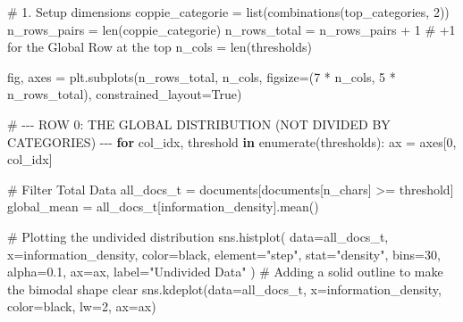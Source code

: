 \documentclass[
  italian,
  a4paper,
]{article}
\newenvironment{Shaded}{\begin{snugshade}}{\end{snugshade}}
\newcommand{\BuiltInTok}[1]{\textcolor[rgb]{0.00,0.23,0.31}{#1}}
\newcommand{\CommentTok}[1]{\textcolor[rgb]{0.37,0.37,0.37}{#1}}
\newcommand{\ControlFlowTok}[1]{\textcolor[rgb]{0.00,0.23,0.31}{\textbf{#1}}}
\newcommand{\DecValTok}[1]{\textcolor[rgb]{0.68,0.00,0.00}{#1}}
\newcommand{\FloatTok}[1]{\textcolor[rgb]{0.68,0.00,0.00}{#1}}
\newcommand{\KeywordTok}[1]{\textcolor[rgb]{0.00,0.23,0.31}{\textbf{#1}}}
\newcommand{\NormalTok}[1]{\textcolor[rgb]{0.00,0.23,0.31}{#1}}
\newcommand{\OperatorTok}[1]{\textcolor[rgb]{0.37,0.37,0.37}{#1}}
\newcommand{\StringTok}[1]{\textcolor[rgb]{0.13,0.47,0.30}{#1}}
\newcommand{\VariableTok}[1]{\textcolor[rgb]{0.07,0.07,0.07}{#1}}
\begin{document}
\begin{Shaded}
\begin{Highlighting}[]
\CommentTok{\# 1. Setup dimensions}
\NormalTok{coppie\_categorie }\OperatorTok{=} \BuiltInTok{list}\NormalTok{(combinations(top\_categories, }\DecValTok{2}\NormalTok{))}
\NormalTok{n\_rows\_pairs }\OperatorTok{=} \BuiltInTok{len}\NormalTok{(coppie\_categorie)}
\NormalTok{n\_rows\_total }\OperatorTok{=}\NormalTok{ n\_rows\_pairs }\OperatorTok{+} \DecValTok{1} \CommentTok{\# +1 for the Global Row at the top}
\NormalTok{n\_cols }\OperatorTok{=} \BuiltInTok{len}\NormalTok{(thresholds)}

\NormalTok{fig, axes }\OperatorTok{=}\NormalTok{ plt.subplots(n\_rows\_total, n\_cols, figsize}\OperatorTok{=}\NormalTok{(}\DecValTok{7} \OperatorTok{*}\NormalTok{ n\_cols, }\DecValTok{5} \OperatorTok{*}\NormalTok{ n\_rows\_total), constrained\_layout}\OperatorTok{=}\VariableTok{True}\NormalTok{)}

\CommentTok{\# {-}{-}{-} ROW 0: THE GLOBAL DISTRIBUTION (NOT DIVIDED BY CATEGORIES) {-}{-}{-}}
\ControlFlowTok{for}\NormalTok{ col\_idx, threshold }\KeywordTok{in} \BuiltInTok{enumerate}\NormalTok{(thresholds):}
\NormalTok{    ax }\OperatorTok{=}\NormalTok{ axes[}\DecValTok{0}\NormalTok{, col\_idx]}
    
    \CommentTok{\# Filter Total Data}
\NormalTok{    all\_docs\_t }\OperatorTok{=}\NormalTok{ documents[documents[}\StringTok{\textquotesingle{}n\_chars\textquotesingle{}}\NormalTok{] }\OperatorTok{\textgreater{}=}\NormalTok{ threshold]}
\NormalTok{    global\_mean }\OperatorTok{=}\NormalTok{ all\_docs\_t[}\StringTok{\textquotesingle{}information\_density\textquotesingle{}}\NormalTok{].mean()}
    
    \CommentTok{\# Plotting the undivided distribution}
\NormalTok{    sns.histplot(}
\NormalTok{        data}\OperatorTok{=}\NormalTok{all\_docs\_t, x}\OperatorTok{=}\StringTok{\textquotesingle{}information\_density\textquotesingle{}}\NormalTok{, }
\NormalTok{        color}\OperatorTok{=}\StringTok{\textquotesingle{}black\textquotesingle{}}\NormalTok{, element}\OperatorTok{=}\StringTok{"step"}\NormalTok{, stat}\OperatorTok{=}\StringTok{"density"}\NormalTok{, }
\NormalTok{        bins}\OperatorTok{=}\DecValTok{30}\NormalTok{, alpha}\OperatorTok{=}\FloatTok{0.1}\NormalTok{, ax}\OperatorTok{=}\NormalTok{ax, label}\OperatorTok{=}\StringTok{"Undivided Data"}
\NormalTok{    )}
    \CommentTok{\# Adding a solid outline to make the bimodal shape clear}
\NormalTok{    sns.kdeplot(data}\OperatorTok{=}\NormalTok{all\_docs\_t, x}\OperatorTok{=}\StringTok{\textquotesingle{}information\_density\textquotesingle{}}\NormalTok{, color}\OperatorTok{=}\StringTok{\textquotesingle{}black\textquotesingle{}}\NormalTok{, lw}\OperatorTok{=}\DecValTok{2}\NormalTok{, ax}\OperatorTok{=}\NormalTok{ax)}
    

\end{Highlighting}
\end{Shaded}
\end{document}
